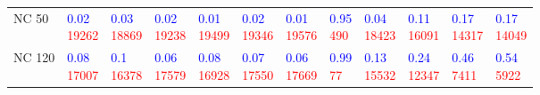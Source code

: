 \begin{tabular}{llllllllllll}
NC 50 & \makecell{\textcolor{blue}{0.02} \\ \textcolor{red}{19262}} & \makecell{\textcolor{blue}{0.03} \\ \textcolor{red}{18869}} & \makecell{\textcolor{blue}{0.02} \\ \textcolor{red}{19238}} & \makecell{\textcolor{blue}{0.01} \\ \textcolor{red}{19499}} & \makecell{\textcolor{blue}{0.02} \\ \textcolor{red}{19346}} & \makecell{\textcolor{blue}{0.01} \\ \textcolor{red}{19576}} & \makecell{\textcolor{blue}{0.95} \\ \textcolor{red}{490}} & \makecell{\textcolor{blue}{0.04} \\ \textcolor{red}{18423}} & \makecell{\textcolor{blue}{0.11} \\ \textcolor{red}{16091}} & \makecell{\textcolor{blue}{0.17} \\ \textcolor{red}{14317}} & \makecell{\textcolor{blue}{0.17} \\ \textcolor{red}{14049}} \\
NC 120 & \makecell{\textcolor{blue}{0.08} \\ \textcolor{red}{17007}} & \makecell{\textcolor{blue}{0.1} \\ \textcolor{red}{16378}} & \makecell{\textcolor{blue}{0.06} \\ \textcolor{red}{17579}} & \makecell{\textcolor{blue}{0.08} \\ \textcolor{red}{16928}} & \makecell{\textcolor{blue}{0.07} \\ \textcolor{red}{17550}} & \makecell{\textcolor{blue}{0.06} \\ \textcolor{red}{17669}} & \makecell{\textcolor{blue}{0.99} \\ \textcolor{red}{77}} & \makecell{\textcolor{blue}{0.13} \\ \textcolor{red}{15532}} & \makecell{\textcolor{blue}{0.24} \\ \textcolor{red}{12347}} & \makecell{\textcolor{blue}{0.46} \\ \textcolor{red}{7411}} & \makecell{\textcolor{blue}{0.54} \\ \textcolor{red}{5922}} \\

\end{tabular}
